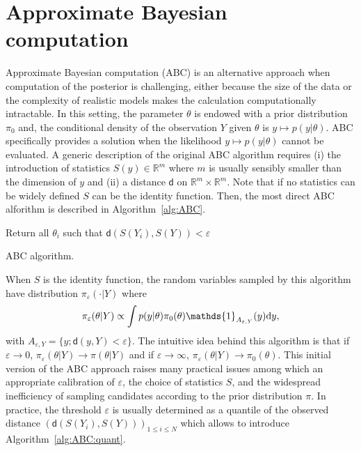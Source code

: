\documentclass[english,graybox,envcountchap,envcountsame,sectrefs,shortlabels]{svmono}
\theoremstyle{style}
\newcommand{\eqsp}{}
\begin{document}
\section{Approximate Bayesian computation}
Approximate Bayesian computation (ABC) is an alternative approach when computation of the posterior is challenging, either because the size of the data or the complexity of realistic models makes the calculation computationally intractable. In this setting, the parameter $\theta$ is endowed with a prior distribution $\pi_0$ and, the conditional density of the observation $Y$ given $\theta$ is $y\mapsto p(y|\theta)$. ABC specifically provides a solution  when the likelihood $y\mapsto p(y|\theta)$ cannot be evaluated. A generic description of the original ABC algorithm requires (i) the introduction of statistics $S(y)\in\mathbb{R}^m$ where $m$ is usually sensibly smaller than the dimension of $y$ and (ii) a distance $\mathsf{d}$ on $\mathbb{R}^m\times \mathbb{R}^m$. Note that if no statistics can be widely defined $S$ can be the identity function. Then, the most direct ABC alforithm is described in Algorithm~\ref{alg:ABC}.

\medskip

\begin{algorithm}[H] \label{alg:ABC}
Return all $\theta_i$ such that $\mathsf{d}(S(Y_i),S(Y))<\varepsilon$\;
\caption{ABC algorithm.}
\end{algorithm}

\medskip

When $S$ is the identity function, the random variables sampled by this  algorithm have distribution $\pi_{\varepsilon}(\cdot |Y)$ where
$$
\pi_{\varepsilon}(\theta|Y)\propto \int p(y|\theta)\pi_0(\theta) \mathds{1}_{A_{\varepsilon,Y}}(y)\rmd y\eqsp,
$$
with $A_{\varepsilon,Y} = \{y\eqsp;\mathsf{d}(y,Y)<\varepsilon\eqsp\}$. The intuitive idea behind this algorithm is that if  $\varepsilon \to 0$, $\pi_{\varepsilon}(\theta|Y) \to \pi(\theta|Y)$ and if $\varepsilon \to \infty$, $\pi_{\varepsilon}(\theta|Y) \to \pi_0(\theta)$. This initial version of the ABC approach raises many practical  issues among which an appropriate calibration of $\varepsilon$, the choice of statistics $S$, and the widespread inefficiency of sampling candidates according to the prior distribution $\pi$. In practice, the threshold $\varepsilon$ is usually determined as a quantile of the observed distance $(\mathsf{d}(S(Y_i),S(Y)))_{1\leqslant i \leqslant N}$ which allows to introduce Algorithm~\ref{alg:ABC:quant}.
\end{document}
